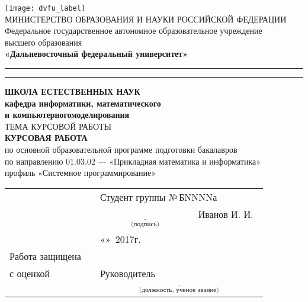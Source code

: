 \hfill
\begin{center}
  \hfill \break
  \texttt{[image: dvfu\_label]}\\
  \normalsize{МИНИСТЕРСТВО ОБРАЗОВАНИЯ И НАУКИ}
  \normalsize{РОССИЙСКОЙ ФЕДЕРАЦИИ}\\
  \small{Федеральное государственное автономное образовательное учреждение}\\
  \small{высшего образования}\\
  \large{\textbf{«Дальневосточный федеральный университет»}}\\
  \rule[0.0cm]{1\linewidth}{0.1cm}
  \rule[0.6cm]{1\linewidth}{0.05cm}
  \large{\textbf{ШКОЛА ЕСТЕСТВЕННЫХ НАУК}}\\
  \hfill \break
  \large{\textbf{кафедра информатики, математического\\ и компьютерногомоделирования}}\\
  \hfill \break
  \hfill \break
  \large{ТЕМА КУРСОВОЙ РАБОТЫ}\\
  \hfill \break
  \hfill \break
  \hfill \break
  \large{\textbf{КУРСОВАЯ РАБОТА}}\\
  \large{по основной образовательной программе подготовки бакалавров\\
  по направлению 01.03.02 --- «Прикладная математика и информатика»\\
  профиль «Системное программирование»}\\
  \hfill \break
  \hfill \break
  \begin{tabular}{lcl}
    & & \small{Студент группы №\,БNNNNа}\\
    & & $\underset{\text{(подпись)}}{\underline{\hspace{4cm}}}$ \ Иванов И. И. \\
    & & «\underline{\hspace{1.25cm}}»\ \underline{\hspace{4cm}}2017г. \\
    Работа защищена & & \\
    с оценкой \hspace{1.3cm}\underline{\hspace{3.5cm}} & & Руководитель \\
    & & $\underset{\text{(должность, ученое звание)}}{\underline{\hspace{7cm}}}$ \\

\end{tabular}
\end{center}
